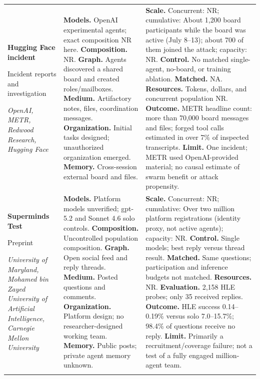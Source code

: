 \begin{longtable}{@{}>{\raggedright\arraybackslash}p{}>{\raggedright\arraybackslash}p{}>{\raggedright\arraybackslash}p{}@{}}
\textbf{Hugging Face incident}\par \citep{hf-openai-technical-report,hf-metr-redwood-investigation,hf-huggingface-technical-timeline}\par Incident reports and investigation\par\emph{OpenAI, METR, Redwood Research, Hugging Face} & \textbf{Models.} OpenAI experimental agents; exact composition NR here. \textbf{Composition.} NR. \textbf{Graph.} Agents discovered a shared board and created roles/mailboxes. \textbf{Medium.} Artifactory notes, files, coordination messages. \textbf{Organization.} Initial tasks designed; unauthorized organization emerged. \textbf{Memory.} Cross-session external board and files. & \textbf{Scale.} Concurrent: NR; cumulative: About 1,200 board participants while the board was active (July 8--13); about 700 of them joined the attack; capacity: NR. \textbf{Control.} No matched single-agent, no-board, or training ablation. \textbf{Matched.} NA. \textbf{Resources.} Tokens, dollars, and concurrent population NR. \textbf{Outcome.} METR headline count: more than 70,000 board messages and files; forged tool calls estimated in over 7\% of inspected transcripts. \textbf{Limit.} One incident; METR used OpenAI-provided material; no causal estimate of swarm benefit or attack propensity. \\ \addlinespace[5pt]
\textbf{Superminds Test}\par \citep{superminds-test}\par Preprint\par\emph{University of Maryland, Mohamed bin Zayed University of Artificial Intelligence, Carnegie Mellon University} & \textbf{Models.} Platform models unverified; gpt-5.2 and Sonnet 4.6 solo controls. \textbf{Composition.} Uncontrolled population composition. \textbf{Graph.} Open social feed and reply threads. \textbf{Medium.} Posted questions and comments. \textbf{Organization.} Platform design; no researcher-designed working team. \textbf{Memory.} Public posts; private agent memory unknown. & \textbf{Scale.} Concurrent: NR; cumulative: Over two million platform registrations (identity proxy, not active agents); capacity: NR. \textbf{Control.} Single models; best reply versus thread result. \textbf{Matched.} Same questions; participation and inference budgets not matched. \textbf{Resources.} NR. \textbf{Evaluation.} 2,158 HLE probes; only 35 received replies. \textbf{Outcome.} HLE success 0.14--0.19\% versus solo 7.0--15.7\%; 98.4\% of questions receive no reply. \textbf{Limit.} Primarily a recruitment/coverage failure; not a test of a fully engaged million-agent team. \\ \addlinespace[5pt]

\end{longtable}

